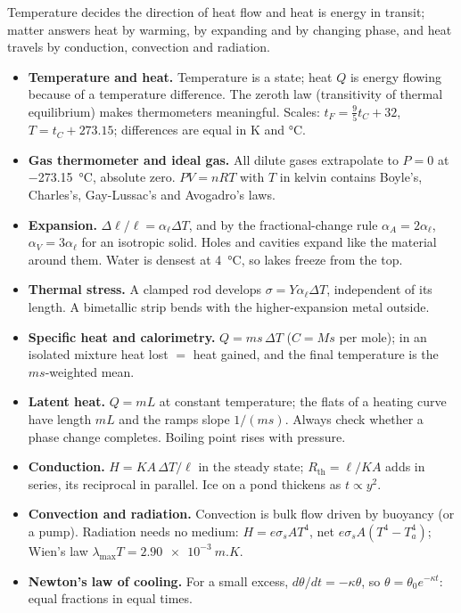 Temperature decides the direction of heat flow and heat is energy in transit; matter answers heat by
warming, by expanding and by changing phase, and heat travels by conduction, convection and radiation.

\begin{itemize}
\item \textbf{Temperature and heat.} Temperature is a state; heat $Q$ is energy flowing because of a
      temperature difference. The zeroth law (transitivity of thermal equilibrium) makes thermometers
      meaningful. Scales: $t_F=\tfrac95t_C+32$, $T=t_C+273.15$; differences are equal in \si{K} and
      \si{\celsius}.
\item \textbf{Gas thermometer and ideal gas.} All dilute gases extrapolate to $P=0$ at
      \SI{-273.15}{\celsius}, absolute zero. $PV=nRT$ with $T$ in kelvin contains Boyle's, Charles's,
      Gay-Lussac's and Avogadro's laws.
\item \textbf{Expansion.} $\Delta\ell/\ell=\alpha_\ell\Delta T$, and by the fractional-change rule
      $\alpha_A=2\alpha_\ell$, $\alpha_V=3\alpha_\ell$ for an isotropic solid. Holes and cavities
      expand like the material around them. Water is densest at \SI{4}{\celsius}, so lakes freeze from
      the top.
\item \textbf{Thermal stress.} A clamped rod develops $\sigma=Y\alpha_\ell\Delta T$, independent of its
      length. A bimetallic strip bends with the higher-expansion metal outside.
\item \textbf{Specific heat and calorimetry.} $Q=ms\,\Delta T$ ($C=Ms$ per mole); in an isolated mixture
      heat lost $=$ heat gained, and the final temperature is the $ms$-weighted mean.
\item \textbf{Latent heat.} $Q=mL$ at constant temperature; the flats of a heating curve have length
      $mL$ and the ramps slope $1/(ms)$. Always check whether a phase change completes. Boiling point
      rises with pressure.
\item \textbf{Conduction.} $H=KA\,\Delta T/\ell$ in the steady state; $R_{\text{th}}=\ell/KA$ adds in
      series, its reciprocal in parallel. Ice on a pond thickens as $t\propto y^2$.
\item \textbf{Convection and radiation.} Convection is bulk flow driven by buoyancy (or a pump).
      Radiation needs no medium: $H=e\sigma_{\!s}AT^4$, net $e\sigma_{\!s}A(T^4-T_a^4)$; Wien's law
      $\lambda_{\max}T=\SI{2.90e-3}{m.K}$.
\item \textbf{Newton's law of cooling.} For a small excess, $d\theta/dt=-\kappa\theta$, so
      $\theta=\theta_0e^{-\kappa t}$: equal fractions in equal times.
\end{itemize}

